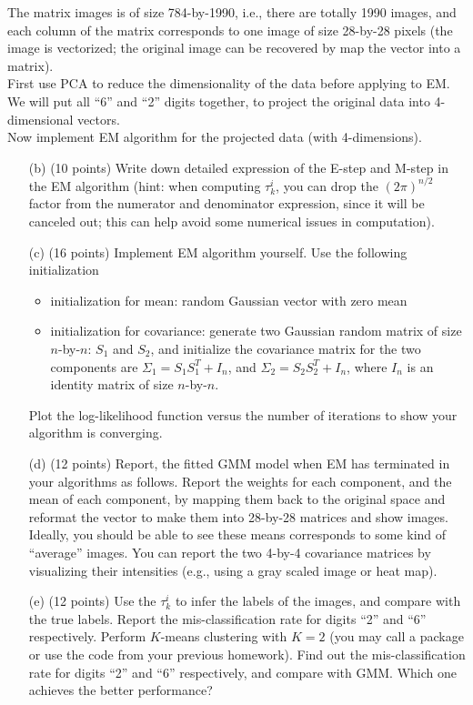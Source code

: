 \documentclass[12pt]{article}
\begin{document}
The matrix \textsf{images} is of size 784-by-1990, i.e., there are totally 1990 images, and each column of the matrix corresponds to one image of size 28-by-28 pixels (the image is vectorized; the original image can be recovered by map the vector into a matrix).  \\

First use PCA to reduce the dimensionality of the data before applying to EM. We will put all ``6'' and ``2'' digits together, to project the original data into 4-dimensional vectors. \\

Now implement EM algorithm for the projected data (with 4-dimensions). 
\begin{enumerate}

\item[(b)] (10 points) Write down detailed expression of the E-step and M-step in the EM algorithm (hint: when computing $\tau_k^i$, you can drop the $(2\pi)^{n/2}$ factor from the numerator and denominator expression, since it will be canceled out; this can help avoid some numerical issues in computation).

\item[(c)] (16 points) Implement EM algorithm yourself. Use the following initialization
\begin{itemize}
\item initialization for mean: random Gaussian vector with zero mean
\item initialization for covariance: generate two Gaussian random matrix of size $n$-by-$n$: $S_1$ and $S_2$, and initialize the covariance matrix for the two components are $\Sigma_1 = S_1 S_1^T + I_n$, and  $\Sigma_2 = S_2 S_2^T + I_n$, where $I_n$ is an identity matrix of size $n$-by-$n$. 
\end{itemize}
Plot the log-likelihood function versus the number of iterations to show your algorithm is converging.

\item[(d)] (12 points) Report, the fitted GMM model when EM has terminated in your algorithms as follows. Report the weights for each component, and the mean of each component, by mapping them back to the original space and reformat the vector to make them into 28-by-28 matrices and show images. Ideally, you should be able to see these means corresponds to some kind of ``average'' images.  You can report the two 4-by-4 covariance matrices by visualizing their intensities (e.g., using a gray scaled image or heat map). 

\item[(e)] (12 points) Use the $\tau_{k}^i$ to infer the labels of the images, and compare with the true labels. Report the mis-classification rate for digits ``2'' and ``6'' respectively. Perform $K$-means clustering with $K=2$ (you may call a package or use the code from your previous homework). Find out the  mis-classification rate for digits ``2'' and ``6'' respectively, and compare with GMM. Which one achieves the better performance?

\end{enumerate}
\end{document}
